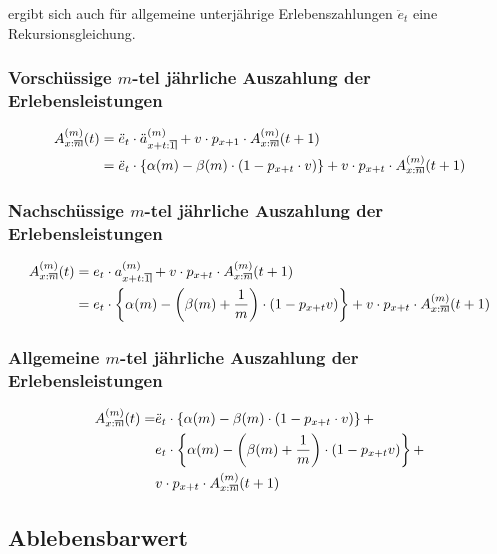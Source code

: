 \documentclass[a4paper,10pt]{article}
\makeatletter
\DeclareRobustCommand{\act}[2][]{%
\def\arraystretch{0}%
\setlength\arraycolsep{0.5pt}%
\setlength\arrayrulewidth{0.5pt}%
\setbox0=\hbox{$\scriptstyle#1\ifx#1\empty{asdf}\else:\fi#2$}%
\begin{array}[b]{*2{@{}>{\scriptstyle}c}|}
\cline{2-2}%
\rule[1.25pt]{0pt}{\ht0}%
#1\ifx#1\empty\else:\fi & #2%
\end{array}%
}
\makeatother
\begin{document}
ergibt sich auch für allgemeine unterjährige Erlebenszahlungen $\ddot{e}_t$ eine Rekursionsgleichung.

\subsubsection{Vorschüssige $m$-tel jährliche Auszahlung der Erlebensleistungen}


\begin{align*}
A^{(m)}_{\act[x]{n}}(t) &= \ddot{e}_t \cdot \ddot{a}_{\act[x+t]{1}}^{(m)} + v \cdot p_{x+1} \cdot A^{(m)}_{\act[x]{n}}(t+1)\\
  &= \ddot{e}_t \cdot \left\{\alpha(m)  - \beta(m) \cdot \left(1-p_{x+t} \cdot v\right)\right\} + v\cdot p_{x+t} \cdot A^{(m)}_{\act[x]{n}}(t+1)
\end{align*}


\subsubsection{Nachschüssige $m$-tel jährliche Auszahlung der Erlebensleistungen}

\begin{align*}
A^{(m)}_{\act[x]{n}}(t) &= e_t \cdot a_{\act[x+t]{1}}^{(m)} + v \cdot p_{x+t} \cdot A^{(m)}_{\act[x]{n}}(t+1)\\
   &= e_t\cdot\left\{\alpha(m) - \left(\beta(m)+\frac1m\right)\cdot\left(1-p_{x+t} v\right)\right\} + v\cdot p_{x+t} \cdot A^{(m)}_{\act[x]{n}}(t+1)
\end{align*}

\subsubsection{Allgemeine $m$-tel jährliche Auszahlung der Erlebensleistungen}


\begin{align*}
A^{(m)}_{\act[x]{n}}(t) = &\ddot{e}_t \cdot \left\{\alpha(m)  - \beta(m) \cdot \left(1-p_{x+t} \cdot v\right)\right\} +  \\
 &e_t\cdot\left\{\alpha(m) - \left(\beta(m)+\frac1m\right)\cdot\left(1-p_{x+t} v\right)\right\} + \\
 &v\cdot p_{x+t} \cdot A^{(m)}_{\act[x]{n}}(t+1)
\end{align*}




\subsection{Ablebensbarwert}
\end{document}
